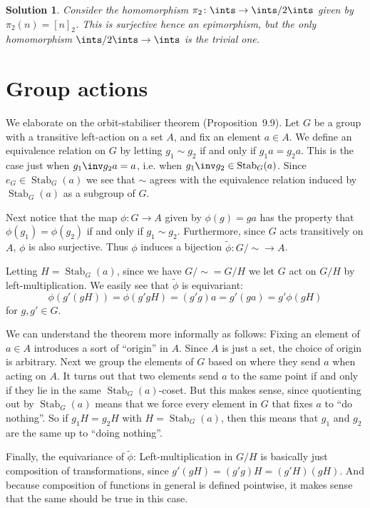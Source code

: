 \documentclass[article, a4paper, 11pt, oneside]{memoir}
\numberwithin{equation}{chapter}
\DeclareMathOperator{\stab}{Stab}
\theoremstyle{nonumberplain}
\newtheorem{solution}{Solution}
\begin{document}
\begin{solution}
    Consider the homomorphism $\pi_2 \colon \ints \to \ints/2\ints$ given by $\pi_2(n) = [n]_2$. This is surjective hence an epimorphism, but the only homomorphism $\ints/2\ints \to \ints$ is the trivial one.
\end{solution}


\section{Group actions}

\begin{remark}
    We elaborate on the orbit-stabiliser theorem (Proposition~9.9). Let $G$ be a group with a transitive left-action on a set $A$, and fix an element $a \in A$. We define an equivalence relation on $G$ by letting $g_1 \sim g_2$ if and only if $g_1 a = g_2 a$. This is the case just when $g_1\inv g_2 a = a$, i.e. when $g_1\inv g_2 \in \stab_G(a)$. Since $e_G \in \stab_G(a)$ we see that $\sim$ agrees with the equivalence relation induced by $\stab_G(a)$ as a subgroup of $G$.

    Next notice that the map $\phi \colon G \to A$ given by $\phi(g) = ga$ has the property that $\phi(g_1) = \phi(g_2)$ if and only if $g_1 \sim g_2$. Furthermore, since $G$ acts transitively on $A$, $\phi$ is also surjective. Thus $\phi$ induces a bijection $\tilde\phi \colon G/{\sim} \to A$.

    Letting $H = \stab_G(a)$, since we have $G/{\sim} = G/H$ we let $G$ act on $G/H$ by left-multiplication. We easily see that $\tilde\phi$ is equivariant:
    \begin{equation*}
        \phi(g'(gH))
            = \phi(g'gH)
            = (g'g)a
            = g'(ga)
            = g' \phi(gH)
    \end{equation*}
    for $g,g' \in G$.

    We can understand the theorem more informally as follows: Fixing an element of $a \in A$ introduces a sort of \enquote{origin} in $A$. Since $A$ is just a set, the choice of origin is arbitrary. Next we group the elements of $G$ based on where they send $a$ when acting on $A$. It turns out that two elements send $a$ to the same point if and only if they lie in the same $\stab_G(a)$-coset. But this makes sense, since quotienting out by $\stab_G(a)$ means that we force every element in $G$ that fixes $a$ to \enquote{do nothing}. So if $g_1H = g_2H$ with $H = \stab_G(a)$, then this means that $g_1$ and $g_2$ are the same up to \enquote{doing nothing}.

    Finally, the equivariance of $\tilde\phi$: Left-multiplication in $G/H$ is basically just composition of transformations, since $g'(gH) = (g'g)H = (g'H)(gH)$. And because composition of functions in general is defined pointwise, it makes sense that the same should be true in this case.
\end{remark}
\end{document}
